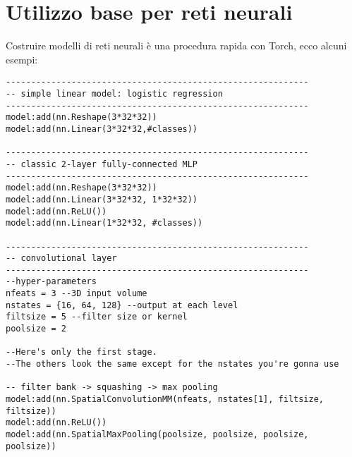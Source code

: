 \section{Utilizzo base per reti neurali}
Costruire modelli di reti neurali è una procedura rapida con Torch, ecco alcuni esempi: 
\begin{lstlisting}[language={[5.2]Lua}]
------------------------------------------------------------
-- simple linear model: logistic regression
------------------------------------------------------------
model:add(nn.Reshape(3*32*32))
model:add(nn.Linear(3*32*32,#classes))

------------------------------------------------------------
-- classic 2-layer fully-connected MLP
------------------------------------------------------------
model:add(nn.Reshape(3*32*32))
model:add(nn.Linear(3*32*32, 1*32*32))
model:add(nn.ReLU())
model:add(nn.Linear(1*32*32, #classes))

------------------------------------------------------------
-- convolutional layer
------------------------------------------------------------
--hyper-parameters
nfeats = 3 --3D input volume
nstates = {16, 64, 128} --output at each level
filtsize = 5 --filter size or kernel 
poolsize = 2

--Here's only the first stage. 
--The others look the same except for the nstates you're gonna use

-- filter bank -> squashing -> max pooling
model:add(nn.SpatialConvolutionMM(nfeats, nstates[1], filtsize, filtsize))
model:add(nn.ReLU())
model:add(nn.SpatialMaxPooling(poolsize, poolsize, poolsize, poolsize))
\end{lstlisting}
